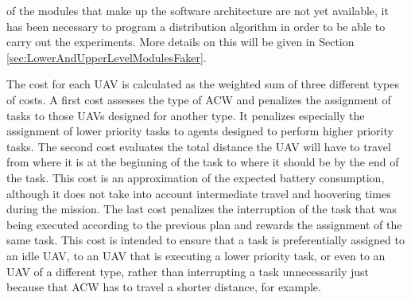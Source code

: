 of the modules that make up the software architecture are not yet available, it has been necessary to program a distribution algorithm in order to be able to carry out the experiments. More details on this will be given in Section \ref{sec:LowerAndUpperLevelModulesFaker}.

The cost for each \gls{UAV} is calculated as the weighted sum of three different types of costs. A first cost assesses the type of \gls{ACW} and penalizes the assignment of tasks to those \glspl{UAV} designed for another type. It penalizes especially the assignment of lower priority tasks to agents designed to perform higher priority tasks. The second cost evaluates the total distance the \gls{UAV} will have to travel from where it is at the beginning of the task to where it should be by the end of the task. This cost is an approximation of the expected battery consumption, although it does not take into account intermediate travel and hoovering times during the mission. The last cost penalizes the interruption of the task that was being executed according to the previous plan and rewards the assignment of the same task. This cost is intended to ensure that a task is preferentially assigned to an idle \gls{UAV}, to an \gls{UAV} that is executing a lower priority task, or even to an \gls{UAV} of a different type, rather than interrupting a task unnecessarily just because that \gls{ACW} has to travel a shorter distance, for example.

